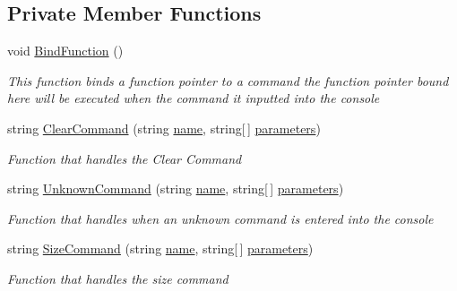\subsection*{Private Member Functions}
\begin{DoxyCompactItemize}
\item 
void \hyperlink{class_c_p_u___o_s___simulator_1_1_console_1_1_console_command_af8141f5684792a07c6581fb032155e56}{Bind\+Function} ()
\begin{DoxyCompactList}\small\item\em This function binds a function pointer to a command the function pointer bound here will be executed when the command it inputted into the console \end{DoxyCompactList}\item 
string \hyperlink{class_c_p_u___o_s___simulator_1_1_console_1_1_console_command_acd9c603dea4eebeb095c6e05fe97a91e}{Clear\+Command} (string \hyperlink{class_c_p_u___o_s___simulator_1_1_console_1_1_console_command_a0ba819d58268ef4f9bab12089a9fd1a4}{name}, string\mbox{[}$\,$\mbox{]} \hyperlink{class_c_p_u___o_s___simulator_1_1_console_1_1_console_command_a00586d96461c740fd20069c604424c22}{parameters})
\begin{DoxyCompactList}\small\item\em Function that handles the Clear Command \end{DoxyCompactList}\item 
string \hyperlink{class_c_p_u___o_s___simulator_1_1_console_1_1_console_command_adb3909a3be152976476805bdf3b7d291}{Unknown\+Command} (string \hyperlink{class_c_p_u___o_s___simulator_1_1_console_1_1_console_command_a0ba819d58268ef4f9bab12089a9fd1a4}{name}, string\mbox{[}$\,$\mbox{]} \hyperlink{class_c_p_u___o_s___simulator_1_1_console_1_1_console_command_a00586d96461c740fd20069c604424c22}{parameters})
\begin{DoxyCompactList}\small\item\em Function that handles when an unknown command is entered into the console \end{DoxyCompactList}\item 
string \hyperlink{class_c_p_u___o_s___simulator_1_1_console_1_1_console_command_a5767cc6343b192fe16e5e98aec2292e2}{Size\+Command} (string \hyperlink{class_c_p_u___o_s___simulator_1_1_console_1_1_console_command_a0ba819d58268ef4f9bab12089a9fd1a4}{name}, string\mbox{[}$\,$\mbox{]} \hyperlink{class_c_p_u___o_s___simulator_1_1_console_1_1_console_command_a00586d96461c740fd20069c604424c22}{parameters})
\begin{DoxyCompactList}\small\item\em Function that handles the size command \end{DoxyCompactList}\item 

\end{DoxyCompactItemize}
